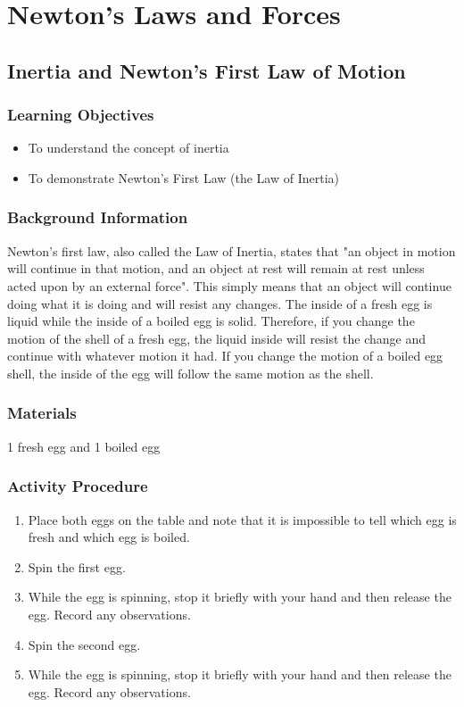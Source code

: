 \section{Newton's Laws and Forces}

\subsection{Inertia and Newton's First Law of Motion}

\subsubsection*{Learning Objectives}
\begin{itemize}
\item{To understand the concept of inertia} 
\item{To demonstrate Newton's First Law (the Law of Inertia)} 
\end{itemize}

\subsubsection*{Background Information}
Newton's first law, also called the Law of Inertia, states that "an object in motion will continue in that motion, and an object at rest will remain at rest unless acted upon by an external force". This simply means that an object will continue doing what it is doing and will resist any changes.  
The inside of a fresh egg is liquid while the inside of a boiled egg is solid. Therefore, if you change the motion of the shell of a fresh egg, the liquid inside will resist the change and continue with whatever motion it had. If you change the motion of a boiled egg shell, the inside of the egg will follow the same motion as the shell.  

\subsubsection*{Materials}
1 fresh egg and 1 boiled egg

\subsubsection*{Activity Procedure}
\begin{enumerate}
\item{Place both eggs on the table and note that it is impossible to tell which egg is fresh and which egg is boiled.} 
\item{Spin the first egg.} 
\item{While the egg is spinning, stop it briefly with your hand and then release the egg.  Record any observations.} 
\item{Spin the second egg.} 
\item{While the egg is spinning, stop it briefly with your hand and then release the egg.  Record any observations.} 
\end{enumerate}

